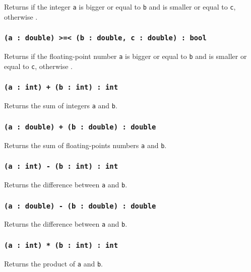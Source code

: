 Returns \true{} if the integer \texttt{a} is bigger or equal to \texttt{b} and is smaller or equal to \texttt{c}, otherwise \false{}.

\subsubsection{\texttt{(a : double) >=< (b : double, c : double) : bool}}

Returns \true{} if the floating-point number \texttt{a} is bigger or equal to \texttt{b} and is smaller or equal to \texttt{c}, otherwise \false{}.

\subsubsection{\texttt{(a : int) + (b : int) : int}}

Returns the sum of integers \texttt{a} and \texttt{b}.

\subsubsection{\texttt{(a : double) + (b : double) : double}}

Returns the sum of floating-points numbers \texttt{a} and \texttt{b}.

\subsubsection{\texttt{(a : int) - (b : int) : int}}

Returns the difference between \texttt{a} and \texttt{b}.

\subsubsection{\texttt{(a : double) - (b : double) : double}}

Returns the difference between \texttt{a} and \texttt{b}.

\subsubsection{\texttt{(a : int) * (b : int) : int}}

Returns the product of \texttt{a} and \texttt{b}.

